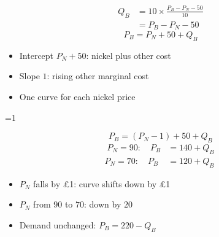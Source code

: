 \documentclass{beamer}
\newcommand{\showanswers}{0}
\begin{document}
\begin{frame}[plain,label=w2_wt5_industry]
  \Large
  \begin{align*}
    \tag{16}\;Q_B &= 10 \times \frac{P_B - P_N - 50}{10}\\
                 &= P_B - P_N - 50
  \end{align*}
  \[
    \tag{17}\;P_B = P_N + 50 + Q_B
  \]

  \vspace{0.3em}
  \begin{itemize}\Large
    \item Intercept $P_N + 50$: nickel plus other cost
    \item Slope $1$: rising other marginal cost
    \item One curve for each nickel price
  \end{itemize}
\end{frame}

\ifnum\showanswers=1
\begin{frame}[plain,label=w2_ans_q31b]
  \Large
  \[
    \tag{M34}\;P_B = (P_N - 1) + 50 + Q_B
  \]
  \begin{align*}
    \tag{M35}\;P_N = 90: \quad P_B &= 140 + Q_B\\
    P_N = 70: \quad P_B &= 120 + Q_B
  \end{align*}

  \vspace{0.3em}
  \begin{itemize}\Large
    \item $P_N$ falls by \pounds 1: curve shifts down by \pounds 1
    \item $P_N$ from $90$ to $70$: down by $20$
    \item Demand unchanged: $P_B = 220 - Q_B$
  \end{itemize}
\end{frame}
\fi
\end{document}
